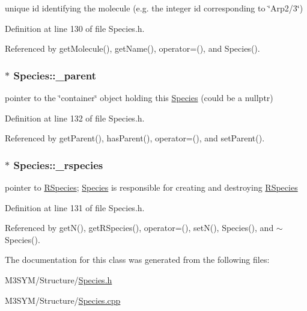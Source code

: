 unique id identifying the molecule (e.\+g. the integer id corresponding to \char`\"{}\+Arp2/3\char`\"{}) 



Definition at line 130 of file Species.\+h.



Referenced by get\+Molecule(), get\+Name(), operator=(), and Species().

\hypertarget{classSpecies_a747392355a5d95f5dfd769a56076f538}{
\subsubsection[{\+\_\+parent}]{$\ast$ Species\+::\+\_\+parent\hspace{0.3cm}{\ttfamily [private]}}}\label{classSpecies_a747392355a5d95f5dfd769a56076f538}


pointer to the \char`\"{}container\char`\"{} object holding this \hyperlink{classSpecies}{Species} (could be a nullptr) 



Definition at line 132 of file Species.\+h.



Referenced by get\+Parent(), has\+Parent(), operator=(), and set\+Parent().

\hypertarget{classSpecies_a8267607e66889feba64d1c00674337af}{
\subsubsection[{\+\_\+rspecies}]{$\ast$ Species\+::\+\_\+rspecies\hspace{0.3cm}{\ttfamily [private]}}}\label{classSpecies_a8267607e66889feba64d1c00674337af}


pointer to \hyperlink{classRSpecies}{R\+Species}; \hyperlink{classSpecies}{Species} is responsible for creating and destroying \hyperlink{classRSpecies}{R\+Species} 



Definition at line 131 of file Species.\+h.



Referenced by get\+N(), get\+R\+Species(), operator=(), set\+N(), Species(), and $\sim$\+Species().



The documentation for this class was generated from the following files\+:\begin{DoxyCompactItemize}
\item 
M3\+S\+Y\+M/\+Structure/\hyperlink{Species_8h}{Species.\+h}\item 
M3\+S\+Y\+M/\+Structure/\hyperlink{Species_8cpp}{Species.\+cpp}\end{DoxyCompactItemize}
